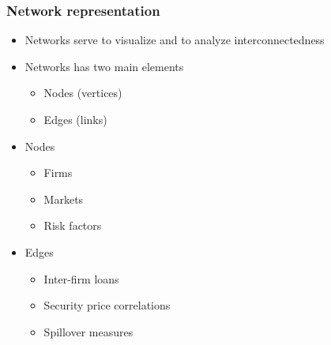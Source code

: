 \documentclass[aspectratio=43,dvipsnames,usenames, svgnames]{beamer}
\begin{document}
\begin{frame} %
\frametitle{Network representation}
\begin{itemize}
	\item Networks serve to visualize and to analyze interconnectedness
	\smallskip
	\item Networks has two main elements
	\begin{itemize}
		\item Nodes (vertices)
		\item Edges (links)
	\end{itemize}
	\smallskip
	\item Nodes
	\begin{itemize}
		\item Firms
		\item Markets
		\item Risk factors
	\end{itemize}
	\smallskip
	\item Edges
	\begin{itemize}
		\item Inter-firm loans
		\item Security price correlations
		\item Spillover measures
	\end{itemize}
\end{itemize}
\end{frame}
\end{document}
